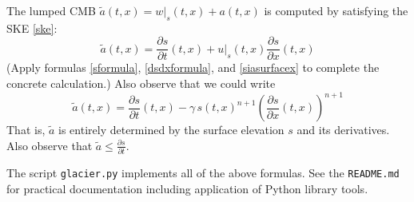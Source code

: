 \documentclass[letterpaper,final,12pt,reqno]{amsart}
\begin{document}
The lumped CMB $\tilde a(t,x) = w|_s(t,x) + a(t,x)$ is computed by satisfying the SKE \eqref{ske}:
\begin{equation}
\tilde a(t,x) = \frac{\partial s}{\partial t}(t,x) + u|_s(t,x) \frac{\partial s}{\partial x}(t,x) \label{atildeformula}
\end{equation}
(Apply formulas \eqref{sformula}, \eqref{dsdxformula}, and \eqref{siasurfacex} to complete the concrete calculation.)  Also observe that we could write
\begin{equation}
\tilde a(t,x) = \frac{\partial s}{\partial t}(t,x) - \gamma\, s(t,x)^{n+1} \left(\frac{\partial s}{\partial x}(t,x)\right)^{n+1} \label{atildefroms}
\end{equation}
That is, $\tilde a$ is entirely determined by the surface elevation $s$ and its derivatives.  Also observe that $\tilde a \le \frac{\partial s}{\partial t}$.

The script \texttt{glacier.py} implements all of the above formulas.  See the \texttt{README.md} for practical documentation including application of Python library tools.

\small
\bigskip


\end{document}
